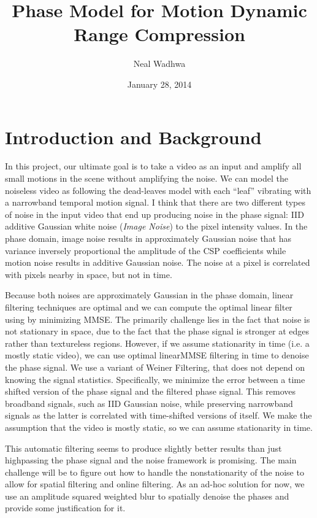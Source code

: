 \documentclass[letterpaper, 10pt]{article}
\author{Neal Wadhwa}
\title{Phase Model for Motion Dynamic Range Compression}
\date{January 28, 2014}
\newcommand{\tmop}[1]{\operatorname{#1}}
\numberwithin{equation}{section}
\begin{document}
\newcommand{\D}{\mathcal{D}}
\newcommand{\pr}{\tmop{Pr}}
\newcommand{\R}{\mathbb{R}}
\newcommand{\beq}{\begin{equation}}
\newcommand{\eeq}{\end{equation}}
\newcommand{\E}{\mathbb{E}}
\newcommand{\Var}{\text{Var}}
\noindent
\maketitle
\section{Introduction and Background}
In this project, our ultimate goal is to take a video as an input and amplify all small motions in the scene without amplifying the noise. We can model the noiseless video as following the dead-leaves model with each ``leaf'' vibrating with a narrowband temporal motion signal. I think that there are two different types of noise in the input video that end up producing noise in the phase signal: IID additive Gaussian white noise ({\em Image Noise}) to the pixel intensity values. In the phase domain, image noise results in approximately Gaussian noise that has variance inversely proportional the amplitude of the CSP coefficients while motion noise results in additive Gaussian noise. The noise at a pixel is correlated with pixels nearby in space, but not in time. 

Because both noises are approximately Gaussian in the phase domain, linear filtering techniques are optimal and we can compute the optimal linear filter using by minimizing MMSE. The primarily challenge lies in the fact that noise is not stationary in space, due to the fact that the phase signal is stronger at edges rather than textureless regions. However, if we assume stationarity in time (i.e. a mostly static video), we can use optimal linearMMSE filtering in time to denoise the phase signal. We use a variant of Weiner Filtering, that does not depend on knowing the signal statistics. Specifically, we minimize the error between a time shifted version of the phase signal and the filtered phase signal. This removes broadband signals, such as IID Gaussian noise, while preserving narrowband signals as the latter is correlated with time-shifted versions of itself. We make the assumption that the video is mostly static, so we can assume stationarity in time.

This automatic filtering seems to produce slightly better results than just highpassing the phase signal and the noise framework is promising. The main challenge will be to figure out how to handle the nonstationarity of the noise to allow for spatial filtering and online filtering. As an ad-hoc solution for now, we use an amplitude squared weighted blur to spatially denoise the phases and provide some justification for it. 
\end{document}
